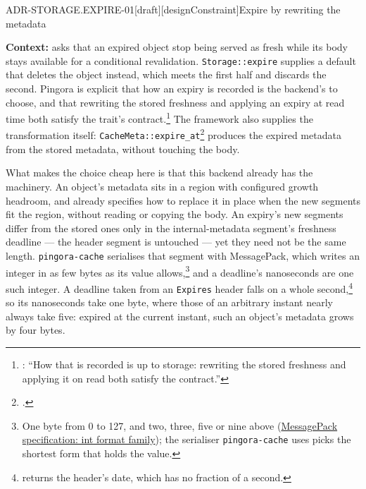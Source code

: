 \begin{requirement}{ADR-STORAGE.EXPIRE-01}[draft][designConstraint]{Expire by rewriting the metadata}


  \textbf{Context:}  asks that an expired object
  stop being served as fresh while its body stays available for a conditional
  revalidation. \texttt{Storage::expire} supplies a default that deletes the
  object instead, which meets the first half and discards the second.
  Pingora is explicit that how an expiry is recorded is the backend's to
  choose, and that rewriting the stored freshness and applying an expiry at
  read time both satisfy the trait's
  contract.\footnote{:
  ``How that is recorded is up to storage: rewriting the stored freshness and
  applying it on read both satisfy the contract.''} The framework also supplies
  the transformation itself:
  \texttt{CacheMeta::expire\_at}\footnote{.}
  produces the expired metadata from the stored metadata, without touching the
  body.

  What makes the choice cheap here is that this backend already has the
  machinery. An object's metadata sits in a region with configured growth
  headroom, and  already specifies how to
  replace it in place when the new segments fit the region, without reading
  or copying the body. An expiry's new segments differ from the stored ones
  only in the internal-metadata segment's freshness deadline --- the header
  segment is untouched --- yet they need not be the same length.
  \texttt{pingora-cache} serialises that segment with MessagePack, which
  writes an integer in as few bytes as its value
  allows,\footnote{One byte from 0 to 127, and two, three, five or nine above
  (\href{https://github.com/msgpack/msgpack/blob/master/spec.md\#int-format-family}{MessagePack
  specification: int format family}); the serialiser \texttt{pingora-cache}
  uses picks the shortest form that holds the value.} and a deadline's
  nanoseconds are one such integer. A deadline taken from an
  \texttt{Expires} header falls on a whole
  second,\footnote{
  returns the header's date, which has no fraction of a second.} so its
  nanoseconds take one byte, where those of an arbitrary instant nearly
  always take five: expired at the current instant, such an object's
  metadata grows by four bytes.


\end{requirement}
